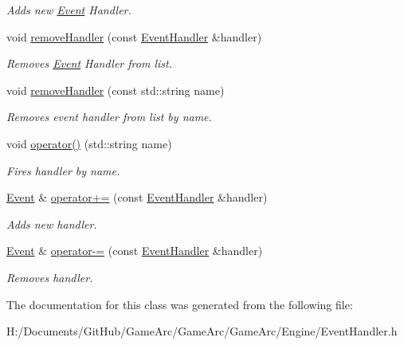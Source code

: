\begin{DoxyCompactItemize}
\begin{DoxyCompactList}\small\item\em Adds new \hyperlink{class_event}{Event} Handler. \end{DoxyCompactList}\item 
\hypertarget{class_event_a2f1428fb85f6b18a4ebda87b4dd4c52a}{void \hyperlink{class_event_a2f1428fb85f6b18a4ebda87b4dd4c52a}{remove\+Handler} (const \hyperlink{class_event_handler}{Event\+Handler} \&handler)}\label{class_event_a2f1428fb85f6b18a4ebda87b4dd4c52a}

\begin{DoxyCompactList}\small\item\em Removes \hyperlink{class_event}{Event} Handler from list. \end{DoxyCompactList}\item 
\hypertarget{class_event_aa747543d37a7c6a5f36a8ae936b2570f}{void \hyperlink{class_event_aa747543d37a7c6a5f36a8ae936b2570f}{remove\+Handler} (const std\+::string name)}\label{class_event_aa747543d37a7c6a5f36a8ae936b2570f}

\begin{DoxyCompactList}\small\item\em Removes event handler from list by name. \end{DoxyCompactList}\item 
\hypertarget{class_event_a2d7239dd7af997cfe4d52a5e3338a84e}{void \hyperlink{class_event_a2d7239dd7af997cfe4d52a5e3338a84e}{operator()} (std\+::string name)}\label{class_event_a2d7239dd7af997cfe4d52a5e3338a84e}

\begin{DoxyCompactList}\small\item\em Fires handler by name. \end{DoxyCompactList}\item 
\hypertarget{class_event_a76d4a7410cab58baeb0b7f2bf6adb4a4}{\hyperlink{class_event}{Event} \& \hyperlink{class_event_a76d4a7410cab58baeb0b7f2bf6adb4a4}{operator+=} (const \hyperlink{class_event_handler}{Event\+Handler} \&handler)}\label{class_event_a76d4a7410cab58baeb0b7f2bf6adb4a4}

\begin{DoxyCompactList}\small\item\em Adds new handler. \end{DoxyCompactList}\item 
\hypertarget{class_event_ab5cdb51d593ed01fcd4d1c8dd781db72}{\hyperlink{class_event}{Event} \& \hyperlink{class_event_ab5cdb51d593ed01fcd4d1c8dd781db72}{operator-\/=} (const \hyperlink{class_event_handler}{Event\+Handler} \&handler)}\label{class_event_ab5cdb51d593ed01fcd4d1c8dd781db72}

\begin{DoxyCompactList}\small\item\em Removes handler. \end{DoxyCompactList}\end{DoxyCompactItemize}


The documentation for this class was generated from the following file\+:\begin{DoxyCompactItemize}
\item 
H\+:/\+Documents/\+Git\+Hub/\+Game\+Arc/\+Game\+Arc/\+Game\+Arc/\+Engine/Event\+Handler.\+h\end{DoxyCompactItemize}

